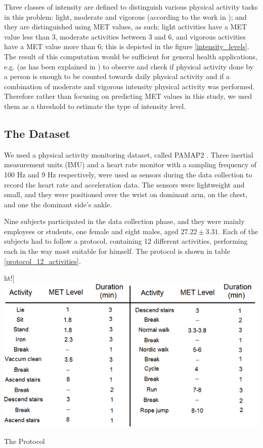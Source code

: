 \documentclass[12pt, a4paper, onecolumn, oneside, parskip=half]{scrartcl}
\begin{document}
Three classes of intensity are defined to distinguish various physical activity tasks in this problem: light, moderate and vigorous (according to the work in \cite{Attila_2012}); and they are distinguished using MET values, as such: light activities have a MET value less than 3, moderate activities between 3 and 6, and vigorous activities have a MET value more than 6; this is depicted in the figure \ref{intensity_levels}. The result of this computation would be sufficient for general health applications, e.g. (as has been explained in \cite{ACSM}) to observe and check if physical activity done by a person is enough to be counted towards daily physical activity and if a combination of moderate and vigorous intensity physical activity was performed. Therefore rather than focusing on predicting MET values in this study, we used them as a threshold to estimate the type of intensity level.


\subsection{The Dataset}

We used a physical activity monitoring dataset, called PAMAP2 \cite{PAMAP_2}. Three inertial measurement units (IMU) and a heart rate monitor with a sampling frequency of 100 Hz and 9 Hz respectively, were used as sensors during the data collection to record the heart rate and acceleration data.
The sensors were lightweight and small, and they were positioned over the wrist on dominant arm, on the chest, and one the dominant side's ankle.

Nine subjects participated in the data collection phase, and they were mainly employees or students, one female and eight males, aged $27.22\pm3.31$. Each of the subjects had to follow a protocol, containing 12 different activities, performing each in the way most suitable for himself. The protocol is shown in table \ref{protocol_12_activities}.

\begin{table}ht!]
  \centering
  \includegraphics[width=155mm]
  {pictures/protocol.png}
  \caption{The Protocol \label{protocol_12_activities}}
\end{table}
\end{document}
